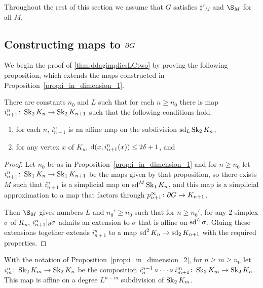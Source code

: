 \documentclass[a4paper]{article}
\begin{document}
Throughout the rest of this section we assume that $G$ satisfies
$\ddag'_M$ and $\S_M$ for all $M$.

\subsection{Constructing maps to $\partial G$}

We begin the proof of \cref{thm:ddagimpliesLCtwo} by proving the following 
proposition, which extends the maps constructed in
Proposition~\ref{prop:i_in_dimension_1}.

\begin{proposition}\label{prop:i_in_dimension_2}
  There are constants $n_0$ and $L$ such that for each $n\geq n_0$ there is map
  $i^n_{n+1}\colon\operatorname{Sk}_2 K_n \to \operatorname{Sk}_2 K_{n+1}$ such that the
  following conditions hold.
  \begin{enumerate}
    \item for each $n$, $i^n_{n+1}$ is an affine map on the subdivision
      $\operatorname{sd}_L\operatorname{Sk}_2 K_n$,
    \item for any vertex $x$ of $K_n$, $\operatorname{d}(x, i^n_{n+1}(x)) \leq 2\delta+1$,
      and
  \end{enumerate}
\end{proposition}

\begin{proof} 
  Let $n_0$ be as in Proposition~\ref{prop:i_in_dimension_1} and for $n \geq
  n_0$ let $i^n_{n+1} \colon \operatorname{Sk}_1 K_n \to \operatorname{Sk}_1 K_{n+1}$ be the maps given
  by that proposition, so there exists $M$ such that $i^n_{n+1}$ is a
  simplicial map on $\operatorname{sd}^M\operatorname{Sk}_1 K_n$, and this map is a simplicial
  approximation to a map that factors through $p^\infty_{n+1} \colon \partial G
  \to K_{n+1}$.

  Then $\S_M$ gives numbers $L$ and $n_0' \geq n_0$ such that for $n \geq
  n_0'$, for any 2-simplex $\sigma$ of $K_n$, $i^n_{n+1}\vert_{\partial}
  \sigma$ admits an extension to $\sigma$ that is affine on $\operatorname{sd}^L\sigma$.
  Gluing these extensions together extends $i^n_{n+1}$ to a map $\operatorname{sd}^2 K_n \to
  \operatorname{sd}_2 K_{n+1}$ with the required properties.
\end{proof}

\begin{definition}
  With the notation of Proposition~\ref{prop:i_in_dimension_2}, for $n \geq m
  \geq n_0$ let $i^n_m \colon \operatorname{Sk}_2 K_m \to \operatorname{Sk}_2 K_n$ be the composition
  $i^{n-1}_n \circ \dotsb \circ i^m_{m+1} \colon \operatorname{Sk}_2 K_m \to 
  \operatorname{Sk}_2 K_n$.  This map is affine on a degree $L^{n-m}$ subdivision of 
  $\operatorname{Sk}_2 K_m$.
\end{definition}
\end{document}
